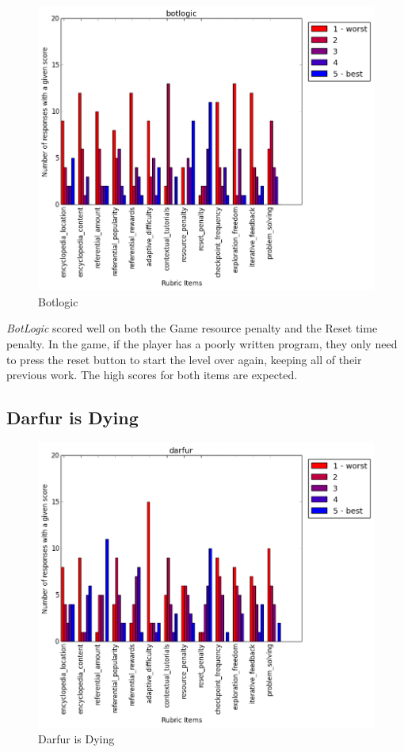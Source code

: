 				\begin{figure}[] 
				\centering 
				\includegraphics[width=\textwidth, height=.4\textheight, keepaspectratio=true]{botlogic_scores.png} 
				\caption{Botlogic}
				\end{figure}

				\textit{BotLogic} scored well on both the Game resource penalty and the Reset time penalty. In the game, if the player has a poorly written program, they only need to press the reset button to start the level over again, keeping all of their previous work. The high scores for both items are expected.

			\subsection{Darfur is Dying}

				\begin{figure}[] 
				\centering 
				\includegraphics[width=\textwidth, height=.4\textheight, keepaspectratio=true]{darfur_scores.png} 
				\caption{Darfur is Dying}
				\end{figure}


